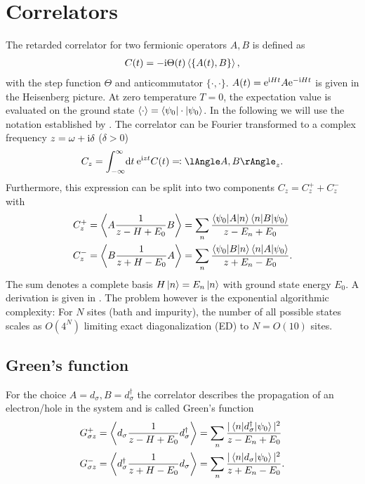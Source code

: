 \section{Correlators}

The retarded correlator for two fermionic operators $A, B$ is defined as
\begin{align}
    C(t) = -\mathrm{i} \Theta(t) \braket{\{A(t), B\}},
\end{align}
with the step function $\Theta$ and anticommutator $\{\cdot,\cdot\}$.
$A(t) = \mathrm{e}^{\mathrm{i} H t} A \mathrm{e}^{-\mathrm{i} H t}$ is given in the Heisenberg picture.
At zero temperature $T=0$, the expectation value is evaluated on the ground state
$\braket{\cdot} = \braket{\psi_0 | \cdot | \psi_0}$.
In the following we will use the notation established by \cite{Bulla1998}.
The correlator can be Fourier transformed to
a complex frequency $z = \omega + \mathrm{i} \delta$ ($\delta > 0$)
\begin{align}
    C_z = \int_{-\infty}^\infty\! \md t\> \me^{\mi zt} C(t) \eqqcolon \lAngle A, B \rAngle_z.
\end{align}
Furthermore, this expression can be split into two components $C_z = C^+_z + C^-_z$ with
\begin{subequations}
    \begin{align}
        C^+_z
         & =
        \Braket{A \frac{1}{z - H + E_0} B}
        =
        \sum_n \frac{\braket{\psi_0 | A | n}\braket{n | B | \psi_0}}{z - E_n + E_0}
        \\
        C^-_z
         & =
        \Braket{B \frac{1}{z + H - E_0} A}
        =
        \sum_n \frac{\braket{\psi_0 | B | n}\braket{n | A | \psi_0}}{z + E_n - E_0}.
    \end{align}
\end{subequations}
The sum denotes a complete basis $H\ket{n} = E_n\ket{n}$ with ground state energy $E_0$.
A derivation is given in .
The problem however is the exponential algorithmic complexity:
For $N$ sites (bath and impurity), the number of all possible states scales as $O(4^N)$
limiting exact diagonalization (ED) to $N=O(10)$ sites.

\subsection{Green's function}

For the choice $A=d_\sigma, B=d_\sigma^\dag$ the correlator describes
the propagation of an electron/hole in the system and is called Green's function
\begin{subequations}
    \begin{align}
        G^+_{\sigma z}
         & =
        \Braket{d_\sigma \frac{1}{z - H + E_0} d_\sigma^\dag}
        =
        \sum_n \frac{|\braket{n | d_\sigma^\dag | \psi_0}|^2}{z - E_n + E_0}
        \\
        G^-_{\sigma z}
         & =
        \Braket{d_\sigma^\dag \frac{1}{z + H - E_0} d_\sigma}
        =
        \sum_n \frac{|\braket{n | d_\sigma | \psi_0}|^2}{z + E_n - E_0}.
    \end{align}
\end{subequations}

